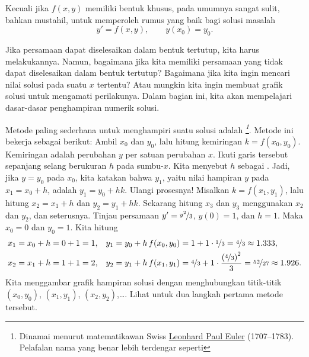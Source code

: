 
Kecuali jika $f(x,y)$ memiliki bentuk khusus,
pada umumnya sangat sulit,
bahkan mustahil, untuk memperoleh rumus yang baik bagi solusi masalah
\begin{equation*}
y' = f(x,y), \qquad y(x_0) = y_0 .
\end{equation*}

Jika persamaan dapat diselesaikan dalam bentuk tertutup, kita harus melakukannya.
Namun, bagaimana jika kita memiliki persamaan yang tidak dapat diselesaikan dalam bentuk tertutup?
Bagaimana jika kita ingin mencari nilai solusi pada suatu $x$ tertentu?
Atau mungkin kita ingin membuat grafik solusi untuk mengamati
perilakunya.  Dalam bagian ini, kita akan mempelajari dasar-dasar penghampiran
numerik solusi.

Metode paling sederhana untuk menghampiri suatu solusi adalah
\emph{%
\footnote{Dinamai menurut matematikawan Swiss
\href{https://en.wikipedia.org/wiki/Euler}{Leonhard Paul Euler}
(1707--1783).  Pelafalan nama yang benar lebih terdengar
seperti }}.  Metode ini bekerja sebagai berikut:
Ambil $x_0$ dan $y_0$, lalu hitung kemiringan $k = f(x_0,y_0)$.  Kemiringan adalah
perubahan $y$ per satuan perubahan $x$.  Ikuti garis tersebut sepanjang selang
berukuran $h$ pada sumbu-$x$.
Kita menyebut $h$ sebagai \emph{}.
Jadi, jika $y = y_0$ pada $x_0$, kita katakan bahwa
$y_1$, yaitu nilai hampiran $y$ pada $x_1 = x_0 + h$, adalah
$y_1 = y_0 + h k$.
Ulangi prosesnya!  Misalkan $k = f(x_1,y_1)$, lalu hitung
$x_2 = x_1 + h$ dan $y_2 = y_1 + h k$.
Sekarang hitung $x_3$ dan $y_3$ menggunakan $x_2$ dan $y_2$, dan seterusnya.
Tinjau persamaan $y' = \nicefrac{y^2}{3}$, $y(0)=1$, dan $h=1$.
Maka $x_0=0$ dan $y_0 = 1$.  Kita hitung
\begin{align*}
& x_1 = x_0 + h = 0 + 1 = 1, & & y_1 = y_0 + h \, f(x_0,y_0) = 1 + 1 \cdot
\nicefrac{1}{3} = \nicefrac{4}{3} \approx 1.333,\\
& x_2 = x_1 + h = 1 + 1 = 2, & & y_2 = y_1 + h \, f(x_1,y_1) =
\nicefrac{4}{3} + 1 \cdot \frac{{(\nicefrac{4}{3})}^2}{3} =
\nicefrac{52}{27} \approx 1.926.
\end{align*}
Kita menggambar grafik hampiran solusi dengan
menghubungkan titik-titik
$(x_0,y_0)$,
$(x_1,y_1)$,
$(x_2,y_2)$,\dots.
Lihat 
untuk dua langkah pertama metode tersebut.

